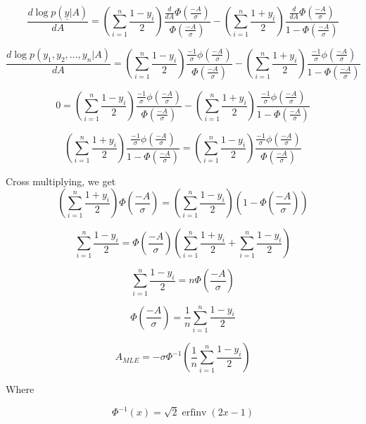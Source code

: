 \documentclass{amsart}
\DeclareMathOperator\erfinv{erfinv}
\begin{document}
\begin{equation}
\frac{d\log p(\underline{y} | A)}{dA} = \left( \sum_{i=1}^{n}\frac{1-y_i}{2} \right)  \frac{\frac{d}{dA} \Phi(\frac{-A}{\sigma})}{\Phi(\frac{-A}{\sigma})} - \left( \sum_{i=1}^{n}\frac{1+y_i}{2} \right)  \frac{\frac{d}{dA} \Phi(\frac{-A}{\sigma})}{1-\Phi(\frac{-A}{\sigma})}
\end{equation}

\begin{equation}
\frac{d\log p(y_1, y_2, ..., y_n | A)}{dA} = \left( \sum_{i=1}^{n}\frac{1-y_i}{2} \right)  \frac{\frac{-1}{\sigma} \phi(\frac{-A}{\sigma})}{\Phi(\frac{-A}{\sigma})} - \left( \sum_{i=1}^{n}\frac{1+y_i}{2} \right)  \frac{\frac{-1}{\sigma} \phi(\frac{-A}{\sigma})}{1-\Phi(\frac{-A}{\sigma})}
\end{equation}

\begin{equation}
0 = \left( \sum_{i=1}^{n}\frac{1-y_i}{2} \right)  \frac{\frac{-1}{\sigma} \phi(\frac{-A}{\sigma})}{\Phi(\frac{-A}{\sigma})} - \left( \sum_{i=1}^{n}\frac{1+y_i}{2} \right)  \frac{\frac{-1}{\sigma} \phi(\frac{-A}{\sigma})}{1-\Phi(\frac{-A}{\sigma})}
\end{equation}

\begin{equation}
\left( \sum_{i=1}^{n}\frac{1+y_i}{2} \right)  \frac{\frac{-1}{\sigma} \phi(\frac{-A}{\sigma})}{1-\Phi(\frac{-A}{\sigma})} = 
\left( \sum_{i=1}^{n}\frac{1-y_i}{2} \right)  \frac{\frac{-1}{\sigma} \phi(\frac{-A}{\sigma})}{\Phi(\frac{-A}{\sigma})} 
\end{equation}

Cross multiplying, we get
\begin{equation}
\left(\sum_{i=1}^{n}\frac{1+y_i}{2}\right)\Phi(\frac{-A}{\sigma}) = \left(\sum_{i=1}^{n}\frac{1-y_i}{2}\right)\left(1-\Phi(\frac{-A}{\sigma})\right)
\end{equation}

\begin{equation}
\sum_{i=1}^{n}\frac{1-y_i}{2} = \Phi(\frac{-A}{\sigma})\left(\sum_{i=1}^{n}\frac{1+y_i}{2} + \sum_{i=1}^{n}\frac{1-y_i}{2}\right)
\end{equation}

\begin{equation}
\sum_{i=1}^{n}\frac{1-y_i}{2} = n\Phi(\frac{-A}{\sigma})
\end{equation}

\begin{equation}
\Phi(\frac{-A}{\sigma})= \frac{1}{n}\sum_{i=1}^{n}\frac{1-y_i}{2}
\end{equation}

\begin{equation}
A_{MLE} = -\sigma\Phi^{-1}\left(\frac{1}{n}\sum_{i=1}^{n}\frac{1-y_i}{2}\right)
\end{equation}

Where

\begin{equation}
\Phi^{-1}(x) = \sqrt{2}\erfinv(2x-1)
\end{equation}


\newpage
\end{document}
